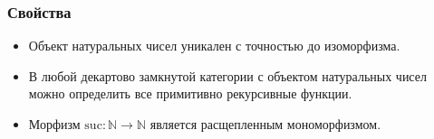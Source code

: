 \documentclass{beamer}
\theoremstyle{definition}
\newcommand{\suc}{\mathrm{suc}}
\begin{document}
\begin{frame}
\frametitle{Свойства}
\begin{itemize}
\item Объект натуральных чисел уникален с точностью до изоморфизма.
\item В любой декартово замкнутой категории с объектом натуральных чисел можно определить все примитивно рекурсивные функции.
\item Морфизм $\suc : \mathbb{N} \to \mathbb{N}$ является расщепленным мономорфизмом.
\end{itemize}
\end{frame}
\end{document}
